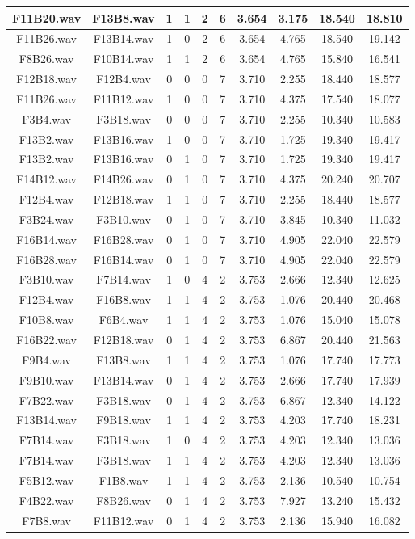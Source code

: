 \documentclass[11pt,a4paper,twoside]{book}
\begin{document}
\begin{longtable}[c]{|c|c|c|c|c|c|c|c|c|c|}
F11B20.wav&F13B8.wav&1&1&2&6&3.654&3.175&18.540&18.810\\ \hline
F11B26.wav&F13B14.wav&1&0&2&6&3.654&4.765&18.540&19.142\\ \hline
F8B26.wav&F10B14.wav&1&1&2&6&3.654&4.765&15.840&16.541\\ \hline
F12B18.wav&F12B4.wav&0&0&0&7&3.710&2.255&18.440&18.577\\ \hline
F11B26.wav&F11B12.wav&1&0&0&7&3.710&4.375&17.540&18.077\\ \hline
F3B4.wav&F3B18.wav&0&0&0&7&3.710&2.255&10.340&10.583\\ \hline
F13B2.wav&F13B16.wav&1&0&0&7&3.710&1.725&19.340&19.417\\ \hline
F13B2.wav&F13B16.wav&0&1&0&7&3.710&1.725&19.340&19.417\\ \hline
F14B12.wav&F14B26.wav&0&1&0&7&3.710&4.375&20.240&20.707\\ \hline
F12B4.wav&F12B18.wav&1&1&0&7&3.710&2.255&18.440&18.577\\ \hline
F3B24.wav&F3B10.wav&0&1&0&7&3.710&3.845&10.340&11.032\\ \hline
F16B14.wav&F16B28.wav&0&1&0&7&3.710&4.905&22.040&22.579\\ \hline
F16B28.wav&F16B14.wav&0&1&0&7&3.710&4.905&22.040&22.579\\ \hline
F3B10.wav&F7B14.wav&1&0&4&2&3.753&2.666&12.340&12.625\\ \hline
F12B4.wav&F16B8.wav&1&1&4&2&3.753&1.076&20.440&20.468\\ \hline
F10B8.wav&F6B4.wav&1&1&4&2&3.753&1.076&15.040&15.078\\ \hline
F16B22.wav&F12B18.wav&0&1&4&2&3.753&6.867&20.440&21.563\\ \hline
F9B4.wav&F13B8.wav&1&1&4&2&3.753&1.076&17.740&17.773\\ \hline
F9B10.wav&F13B14.wav&0&1&4&2&3.753&2.666&17.740&17.939\\ \hline
F7B22.wav&F3B18.wav&0&1&4&2&3.753&6.867&12.340&14.122\\ \hline
F13B14.wav&F9B18.wav&1&1&4&2&3.753&4.203&17.740&18.231\\ \hline
F7B14.wav&F3B18.wav&1&0&4&2&3.753&4.203&12.340&13.036\\ \hline
F7B14.wav&F3B18.wav&1&1&4&2&3.753&4.203&12.340&13.036\\ \hline
F5B12.wav&F1B8.wav&1&1&4&2&3.753&2.136&10.540&10.754\\ \hline
F4B22.wav&F8B26.wav&0&1&4&2&3.753&7.927&13.240&15.432\\ \hline
F7B8.wav&F11B12.wav&0&1&4&2&3.753&2.136&15.940&16.082\\ \hline

\end{longtable}
\end{document}
